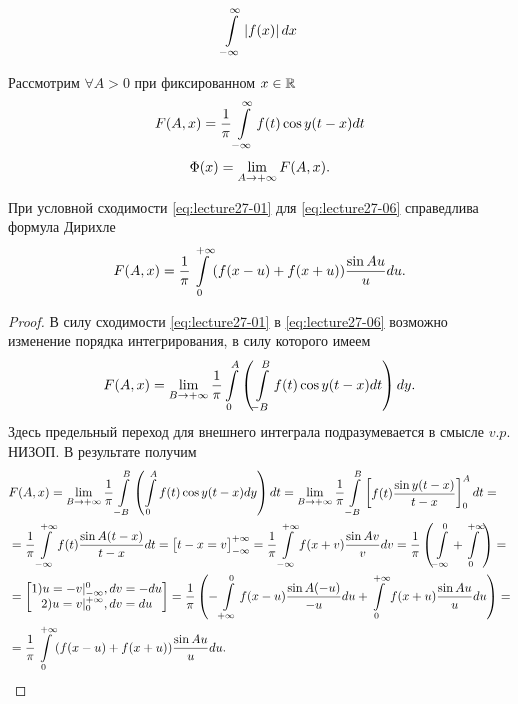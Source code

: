 
\begin{col-answer-preambule}
\end{col-answer-preambule}

\begin{equation}
  \label{eq:lecture27-01}
  \int\limits_{-\infty}^{\infty}\left\lvert f(x) \right\rvert dx
\end{equation}

Рассмотрим $\forall A > 0$ при фиксированном $x \in \mathbb{R}^{}$
\begin{equation}
  \label{eq:lecture27-06}
  F(A, x) = \dfrac{1}{\pi}\int\limits_{-\infty}^{\infty}f(t)\cos y(t - x)dt
\end{equation}
\begin{equation}
  \label{eq:lecture27-07}
  \Phi(x) = \lim\limits_{A \to +\infty}F(A, x).
\end{equation}

\begin{theorem}
  При условной сходимости \eqref{eq:lecture27-01} для \eqref{eq:lecture27-06} справедлива формула
  Дирихле
  \begin{equation}
    \label{eq:lecture27-08}
    F(A, x) = \dfrac{1}{\pi}\int\limits_0^{+\infty}(f(x - u) + f(x + u))\dfrac{\sin Au}{u}du.
  \end{equation}
\end{theorem}
\begin{proof}
  В силу сходимости \eqref{eq:lecture27-01} в \eqref{eq:lecture27-06} возможно изменение порядка
  интегрирования, в силу которого имеем
  \begin{align*}
    F(A, x) = \lim\limits_{B \to +\infty}\dfrac{1}{\pi}\int\limits_0^A\left( 
      \int\limits_{-B}^Bf(t)\cos y(t-x)dt \right)dy.
  \end{align*}
  Здесь предельный переход для внешнего интеграла подразумевается в смысле $v. p.$ НИЗОП. В
  результате получим
  \begin{align*}
    &F(A, x) = \lim\limits_{B \to +\infty}\dfrac{1}{\pi}\int\limits_{-B}^B\left( \int\limits_0^Af(t)\cos y(t-x)dy \right)dt =
    \lim\limits_{B \to +\infty}\dfrac{1}{\pi}\int\limits_{-B}^B\left[\begin{matrix}f(t)\dfrac{\sin y(t - x)}{t - x}\end{matrix}\right]_0^Adt =\\
    &=\dfrac{1}{\pi}\int\limits_{-\infty}^{+\infty}f(t)\dfrac{\sin A(t - x)}{t - x}dt =
    \left[\begin{matrix}t - x = v\end{matrix}\right]_{-\infty}^{+\infty} = \dfrac{1}{\pi}\int\limits_{-\infty}^{+\infty}f(x + v)
    \dfrac{\sin Av}{v}dv = \dfrac{1}{\pi}\left( \int\limits_{-\infty}^0 + \int\limits_0^{+\infty} \right) =\\
    &=\left[\begin{matrix}1) u = -v\vert_{-\infty}^0, dv = -du\\
      2) u = v\vert_0^{+\infty}, dv = du\end{matrix}\right] =
    \dfrac{1}{\pi}\left( -\int\limits_{+\infty}^0f(x -u)\dfrac{\sin A(-u)}{-u}du +
      \int\limits_0^{+\infty}f(x + u)\dfrac{\sin Au}{u}du \right) =\\
    &= \dfrac{1}{\pi}\int\limits_0^{+\infty}(f(x - u) + f(x + u))\dfrac{\sin Au}{u}du.
  \end{align*}
\end{proof}

